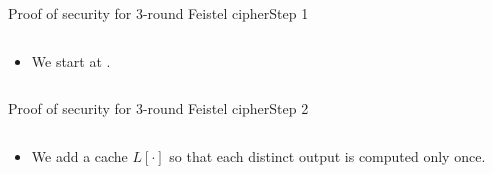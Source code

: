 \documentclass[aspectratio=169, lualatex, handout]{beamer}
\begin{document}
\begin{frame}{Proof of security for 3-round Feistel cipher}{Step 1}
	\begin{columns}[c]
		\begin{column}{0.5\textwidth}
			\begin{itemize}
				\item We start at .
			\end{itemize}
		\end{column}
		\begin{column}{0.5\textwidth}
			\begin{center}
			\end{center}
		\end{column}
	\end{columns}
\end{frame}

\begin{frame}{Proof of security for 3-round Feistel cipher}{Step 2}
	\begin{columns}[c]
		\begin{column}{0.5\textwidth}
			\begin{itemize}
				\item We add a cache $L[\cdot]$ so that each distinct output is computed only once.
			\end{itemize}
		\end{column}
		\begin{column}{0.5\textwidth}
			\begin{center}
			\end{center}
		\end{column}
	\end{columns}
\end{frame}
\end{document}
